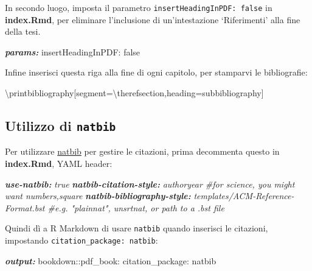 \documentclass[a4paper, 11pt, nobind]{templates/ociamthesis}
\newenvironment{Shaded}{\begin{snugshade}}{\end{snugshade}}
\newcommand{\AnnotationTok}[1]{\textcolor[rgb]{0.56,0.35,0.01}{\textbf{\textit{#1}}}}
\newcommand{\CommentTok}[1]{\textcolor[rgb]{0.56,0.35,0.01}{\textit{#1}}}
\newcommand{\FunctionTok}[1]{\textcolor[rgb]{0.00,0.00,0.00}{#1}}
\newcommand{\NormalTok}[1]{#1}
\renewenvironment{Shaded}
{
  \vspace{10pt}%
  \begin{snugshade}%
}{%
  \end{snugshade}%
  \vspace{8pt}%
}
\begin{document}
In secondo luogo, imposta il parametro \texttt{insertHeadingInPDF:\ false} in \textbf{index.Rmd}, per eliminare l'inclusione di un'intestazione `Riferimenti' alla fine della tesi.

\begin{Shaded}
\begin{Highlighting}[]
\AnnotationTok{params:}
\NormalTok{  insertHeadingInPDF: false}
\end{Highlighting}
\end{Shaded}

Infine inserisci questa riga alla fine di ogni capitolo, per stamparvi le bibliografie:

\begin{Shaded}
\begin{Highlighting}[]
\FunctionTok{\textbackslash{}printbibliography}\NormalTok{[segment=}\FunctionTok{\textbackslash{}therefsection}\NormalTok{,heading=subbibliography]}
\end{Highlighting}
\end{Shaded}

\hypertarget{natbib-custom}{%
\subsection{\texorpdfstring{Utilizzo di \texttt{natbib}}{Utilizzo di natbib}}\label{natbib-custom}}

Per utilizzare \href{https://www.overleaf.com/learn/latex/Bibliography_management_with_natbib}{natbib} per gestire le citazioni, prima decommenta questo in \textbf{index.Rmd}, YAML header:

\begin{Shaded}
\begin{Highlighting}[]
\AnnotationTok{use{-}natbib:}\CommentTok{ true}
\AnnotationTok{natbib{-}citation{-}style:}\CommentTok{ authoryear \#for science, you might want numbers,square}
\AnnotationTok{natbib{-}bibliography{-}style:}\CommentTok{ templates/ACM{-}Reference{-}Format.bst \#e.g. "plainnat", unsrtnat, or path to a .bst file}
\end{Highlighting}
\end{Shaded}

Quindi dì a R Markdown di usare \texttt{natbib} quando inserisci le citazioni, impostando \texttt{citation\_package:\ natbib}:

\begin{Shaded}
\begin{Highlighting}[]
\AnnotationTok{output:}
\NormalTok{  bookdown::pdf\_book:}
\NormalTok{    citation\_package: natbib}
\end{Highlighting}
\end{Shaded}
\end{document}
